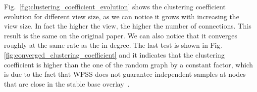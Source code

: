 Fig.~\ref{fig:clustering_coefficient_evolution} shows the clustering coefficient evolution for different view size, as we can notice it grows with increasing the view size. In fact the higher the view, the higher the number of connections. This result is the same on the original paper. We can also notice that it converges roughly at the same rate as the in-degree.
The last test is shown in Fig.\ref{fig:converged_clustering_coefficient} and it indicates that the clustering coefficient is higher than the one of the random graph by a constant factor, which is due to the fact that WPSS does not guarantee independent samples at nodes that are close in the stable base overlay~\cite{wormhole}.


